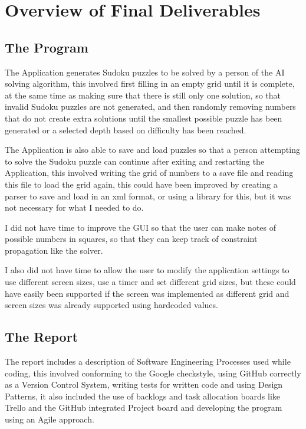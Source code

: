\documentclass[]{final_report}
\begin{document}
\section*{Overview of Final Deliverables}

\subsection*{The Program}

The Application generates Sudoku puzzles to be solved by a person of the AI solving algorithm, this involved first filling in an empty grid until it is complete, at the same time as making sure that there is still only one solution, so that invalid Sudoku puzzles are not generated, and then randomly removing numbers that do not create extra solutions until the smallest possible puzzle has been generated or a selected depth based on difficulty has been reached.

The Application is also able to save and load puzzles so that a person attempting to solve the Sudoku puzzle can continue after exiting and restarting the Application, this involved writing the grid of numbers to a save file and reading this file to load the grid again, this could have been improved by creating a parser to save and load in an xml format, or using a library for this, but it was not necessary for what I needed to do.

I did not have time to improve the GUI so that the user can make notes of possible numbers in squares, so that they can keep track of constraint propagation like the solver.

I also did not have time to allow the user to modify the application settings to use different screen sizes, use a timer and set different grid sizes, but these could have easily been supported if the screen was implemented as different grid and screen sizes was already supported using hardcoded values.

\subsection*{The Report}

The report includes a description of Software Engineering Processes used while coding, this involved conforming to the Google checkstyle, using GitHub correctly as a Version Control System, writing tests for written code and using Design Patterns, it also included the use of backlogs and task allocation boards like Trello and the GitHub integrated Project board and developing the program using an Agile approach.
\end{document}
